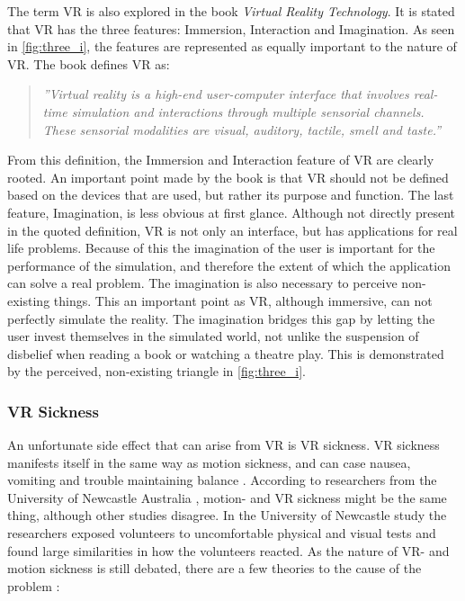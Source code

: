                The term VR is also explored in the book \emph{Virtual Reality Technology}\cite{threei}. It is stated that VR has the three features: Immersion, Interaction and Imagination. As seen in \cref{fig:three_i}, the features are represented as equally important to the nature of VR. The book defines VR as:
                
                \begin{quote}
                    \textit{''Virtual reality is a high-end user-computer interface that involves real-time simulation and interactions through multiple sensorial channels. These sensorial modalities are visual, auditory, tactile, smell and taste.''}
                \end{quote}
                
                From this definition, the Immersion and Interaction feature of VR are clearly rooted. An important point made by the book is that VR should not be defined based on the devices that are used, but rather its purpose and function. The last feature, Imagination, is less obvious at first glance. Although not directly present in the quoted definition, VR is not only an interface, but has applications for real life problems. Because of this the imagination of the user is important for the performance of the simulation, and therefore the extent of which the application can solve a real problem. The imagination is also necessary to perceive non-existing things. This an important point as VR, although immersive, can not perfectly simulate the reality. The imagination bridges this gap by letting the user invest themselves in the simulated world, not unlike the suspension of disbelief when reading a book or watching a theatre play. This is demonstrated by the perceived, non-existing triangle in \cref{fig:three_i}.
                
            \subsubsection{VR Sickness}
                An unfortunate side effect that can arise from VR is VR sickness. VR sickness manifests itself in the same way as motion sickness, and can case nausea, vomiting and trouble maintaining balance \cite{motion_sickness}. According to researchers from the University of Newcastle Australia \cite{vr_sickness}, motion- and VR sickness might be the same thing, although other studies disagree. In the University of Newcastle study the researchers exposed volunteers to uncomfortable physical and visual tests and found large similarities in how the volunteers reacted. As the nature of VR- and motion sickness is still debated, there are a few theories to the cause of the problem \cite{vr_sickness_theories}:
                
